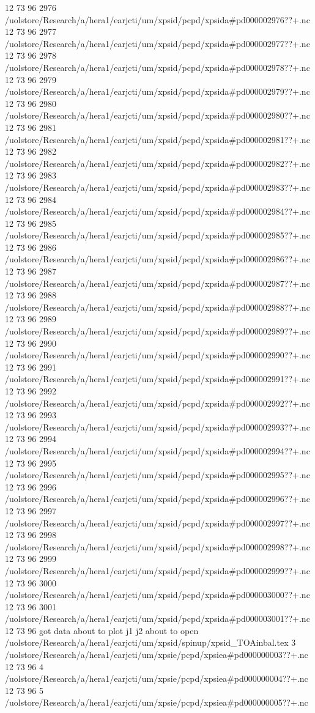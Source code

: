 12 73 96
2976
/uolstore/Research/a/hera1/earjcti/um/xpsid/pcpd/xpsida#pd000002976??+.nc
12 73 96
2977
/uolstore/Research/a/hera1/earjcti/um/xpsid/pcpd/xpsida#pd000002977??+.nc
12 73 96
2978
/uolstore/Research/a/hera1/earjcti/um/xpsid/pcpd/xpsida#pd000002978??+.nc
12 73 96
2979
/uolstore/Research/a/hera1/earjcti/um/xpsid/pcpd/xpsida#pd000002979??+.nc
12 73 96
2980
/uolstore/Research/a/hera1/earjcti/um/xpsid/pcpd/xpsida#pd000002980??+.nc
12 73 96
2981
/uolstore/Research/a/hera1/earjcti/um/xpsid/pcpd/xpsida#pd000002981??+.nc
12 73 96
2982
/uolstore/Research/a/hera1/earjcti/um/xpsid/pcpd/xpsida#pd000002982??+.nc
12 73 96
2983
/uolstore/Research/a/hera1/earjcti/um/xpsid/pcpd/xpsida#pd000002983??+.nc
12 73 96
2984
/uolstore/Research/a/hera1/earjcti/um/xpsid/pcpd/xpsida#pd000002984??+.nc
12 73 96
2985
/uolstore/Research/a/hera1/earjcti/um/xpsid/pcpd/xpsida#pd000002985??+.nc
12 73 96
2986
/uolstore/Research/a/hera1/earjcti/um/xpsid/pcpd/xpsida#pd000002986??+.nc
12 73 96
2987
/uolstore/Research/a/hera1/earjcti/um/xpsid/pcpd/xpsida#pd000002987??+.nc
12 73 96
2988
/uolstore/Research/a/hera1/earjcti/um/xpsid/pcpd/xpsida#pd000002988??+.nc
12 73 96
2989
/uolstore/Research/a/hera1/earjcti/um/xpsid/pcpd/xpsida#pd000002989??+.nc
12 73 96
2990
/uolstore/Research/a/hera1/earjcti/um/xpsid/pcpd/xpsida#pd000002990??+.nc
12 73 96
2991
/uolstore/Research/a/hera1/earjcti/um/xpsid/pcpd/xpsida#pd000002991??+.nc
12 73 96
2992
/uolstore/Research/a/hera1/earjcti/um/xpsid/pcpd/xpsida#pd000002992??+.nc
12 73 96
2993
/uolstore/Research/a/hera1/earjcti/um/xpsid/pcpd/xpsida#pd000002993??+.nc
12 73 96
2994
/uolstore/Research/a/hera1/earjcti/um/xpsid/pcpd/xpsida#pd000002994??+.nc
12 73 96
2995
/uolstore/Research/a/hera1/earjcti/um/xpsid/pcpd/xpsida#pd000002995??+.nc
12 73 96
2996
/uolstore/Research/a/hera1/earjcti/um/xpsid/pcpd/xpsida#pd000002996??+.nc
12 73 96
2997
/uolstore/Research/a/hera1/earjcti/um/xpsid/pcpd/xpsida#pd000002997??+.nc
12 73 96
2998
/uolstore/Research/a/hera1/earjcti/um/xpsid/pcpd/xpsida#pd000002998??+.nc
12 73 96
2999
/uolstore/Research/a/hera1/earjcti/um/xpsid/pcpd/xpsida#pd000002999??+.nc
12 73 96
3000
/uolstore/Research/a/hera1/earjcti/um/xpsid/pcpd/xpsida#pd000003000??+.nc
12 73 96
3001
/uolstore/Research/a/hera1/earjcti/um/xpsid/pcpd/xpsida#pd000003001??+.nc
12 73 96
got data
about to plot
j1
j2
about to open /uolstore/Research/a/hera1/earjcti/um/xpsid/spinup/xpsid_TOAinbal.tex
3
/uolstore/Research/a/hera1/earjcti/um/xpsie/pcpd/xpsiea#pd000000003??+.nc
12 73 96
4
/uolstore/Research/a/hera1/earjcti/um/xpsie/pcpd/xpsiea#pd000000004??+.nc
12 73 96
5
/uolstore/Research/a/hera1/earjcti/um/xpsie/pcpd/xpsiea#pd000000005??+.nc
